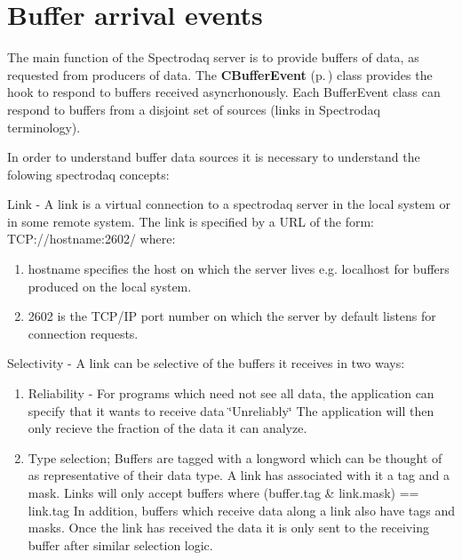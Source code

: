 \section{Buffer arrival events}\label{BufferEvent}


The main function of the Spectrodaq server is to provide buffers of data, as requested from producers of data. The {\bf CBuffer\-Event} {\rm (p.\,\pageref{classCBufferEvent})} class provides the hook to respond to buffers received asyncrhonously. Each Buffer\-Event class  can respond to buffers from a disjoint set of sources (links in Spectrodaq terminology).

In order to understand buffer data sources it is necessary to understand the folowing spectrodaq concepts:\begin{CompactItemize}
\item 
Link - A link is a virtual connection to a spectrodaq server in the local system or in some remote system. The link is specified by a URL of the form: TCP://hostname:2602/ where:\begin{enumerate}
\item 
hostname specifies the host on which the server lives e.g. localhost for buffers produced on the local system.\item 
2602 is the TCP/IP port number on which the server by default listens for connection requests.\end{enumerate}
\item 
Selectivity - A link can be selective of the buffers it receives in two ways:\begin{enumerate}
\item 
Reliability - For programs which need not see all data, the application can specify that it wants to receive data  \char`\"{}Unreliably\char`\"{} The application will then only recieve the fraction of the data it can analyze.\item 
Type selection; Buffers are tagged with a longword which can be thought of as representative of their data type. A link has associated with it a tag and a mask. Links will only accept buffers where (buffer.tag \& link.mask) ==  link.tag In addition, buffers which receive data along a link also have tags and masks. Once the link has received the data it is only sent to the receiving buffer after similar selection logic.\end{enumerate}
\end{CompactItemize}
